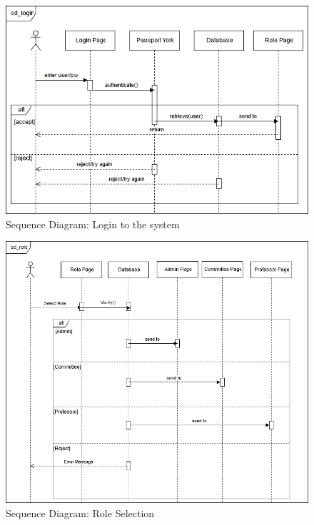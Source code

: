 \documentclass[fontsize=12pt,paper=letter,twoside]{scrartcl}
\begin{document}
\begin{figure}[!htb]
\begin{center}
\includegraphics[width=.99\textwidth]{images/sd_login.png}
\end{center}
\caption{Sequence Diagram: Login to the system}
\label{fig:sd_login}
\end{figure}

\begin{figure}[!htb]
\begin{center}
\includegraphics[width=.99\textwidth]{images/sd_role.png}
\end{center}
\caption{Sequence Diagram: Role Selection}
\label{fig:sd_role_selection}
\end{figure}
\end{document}
